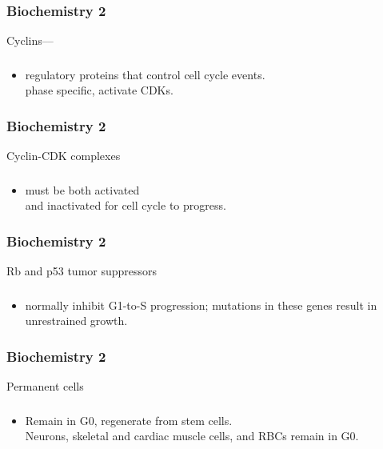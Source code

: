 \documentclass[11pt]{beamer}
\begin{document}
\begin{frame}
 \frametitle{Biochemistry 2}
Cyclins––
\end{frame}

\begin{frame}
 \frametitle{}
\begin{itemize}
\item regulatory proteins that control cell cycle events.  \\ phase specific, activate CDKs.
\end{itemize}
\end{frame}

\begin{frame}
 \frametitle{Biochemistry 2}
Cyclin-CDK complexes
\end{frame}

\begin{frame}
 \frametitle{}
\begin{itemize}
\item must be both activated \\ and inactivated for cell cycle to progress.
\end{itemize}
\end{frame}

\begin{frame}
 \frametitle{Biochemistry 2}
Rb and p53 tumor suppressors 
\end{frame}

\begin{frame}
 \frametitle{}
\begin{itemize}
\item normally
inhibit G1-to-S progression; mutations in these genes result in unrestrained growth.
\end{itemize}
\end{frame}

\begin{frame}
 \frametitle{Biochemistry 2}
Permanent cells
\end{frame}

\begin{frame}
 \frametitle{}
\begin{itemize}
\item Remain in G0, regenerate from stem cells. \\ Neurons, skeletal and cardiac muscle cells, and RBCs remain in G0.
\end{itemize}
\end{frame}
\end{document}
